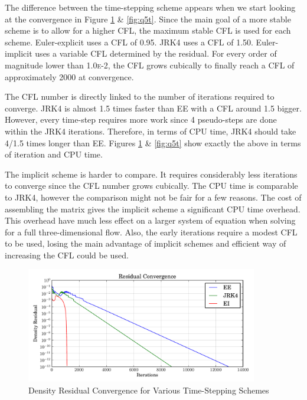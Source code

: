 \documentclass[letterpaper,12pt,]{article}
\begin{document}
The difference between the time-stepping scheme appears when we start looking at the convergence in Figure \ref{fig:q5c} \& \ref{fig:q5t}.
Since the main goal of a more stable scheme is to allow for a higher CFL, the maximum stable CFL is used for each scheme.
Euler-explicit uses a CFL of 0.95.
JRK4 uses a CFL of 1.50.
Euler-implicit uses a variable CFL determined by the residual.
For every order of magnitude lower than 1.0\textsc{e}-2, the CFL grows cubically to finally reach a CFL of approximately 2000 at convergence.

The CFL number is directly linked to the number of iterations required to converge.
JRK4 is almost 1.5 times faster than EE with a CFL around 1.5 bigger.
However, every time-step requires more work since 4 pseudo-steps are done within the JRK4 iterations.
Therefore, in terms of CPU time, JRK4 should take 4/1.5 times longer than EE.
Figures \ref{fig:q5c} \& \ref{fig:q5t} show exactly the above in terms of iteration and CPU time.

The implicit scheme is harder to compare.
It requires considerably less iterations to converge since the CFL number grows cubically.
The CPU time is comparable to JRK4, however the comparison might not be fair for a few reasons.
The cost of assembling the matrix gives the implicit scheme a significant CPU time overhead.
This overhead have much less effect on a larger system of equation when solving for a full three-dimensional flow.
Also, the early iterations require a modest CFL to be used, losing the main advantage of implicit schemes and efficient way of increasing the CFL could be used.


\begin{figure}[!ht]
    \centering
    \includegraphics[width = 0.9\textwidth]{./figures/q5c.pdf}
    \caption {Density Residual Convergence for Various Time-Stepping Schemes}
    \label{fig:q5c}
\end{figure}
\end{document}
